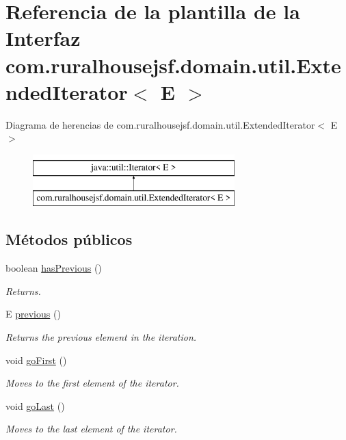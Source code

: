 \hypertarget{interfacecom_1_1ruralhousejsf_1_1domain_1_1util_1_1_extended_iterator}{}\section{Referencia de la plantilla de la Interfaz com.\+ruralhousejsf.\+domain.\+util.\+Extended\+Iterator$<$ E $>$}
\label{interfacecom_1_1ruralhousejsf_1_1domain_1_1util_1_1_extended_iterator}
Diagrama de herencias de com.\+ruralhousejsf.\+domain.\+util.\+Extended\+Iterator$<$ E $>$\begin{figure}[H]
\begin{center}
\leavevmode
\includegraphics[height=2.000000cm]{d5/ded/interfacecom_1_1ruralhousejsf_1_1domain_1_1util_1_1_extended_iterator}
\end{center}
\end{figure}
\subsection*{Métodos públicos}
\begin{DoxyCompactItemize}
\item 
boolean \mbox{\hyperlink{interfacecom_1_1ruralhousejsf_1_1domain_1_1util_1_1_extended_iterator_a8aa41cc3f69db973663cf92a484579a9}{has\+Previous}} ()
\begin{DoxyCompactList}\small\item\em Returns. \end{DoxyCompactList}\item 
E \mbox{\hyperlink{interfacecom_1_1ruralhousejsf_1_1domain_1_1util_1_1_extended_iterator_a4c9f9f5da6e96c08bc44d55517689397}{previous}} ()
\begin{DoxyCompactList}\small\item\em Returns the previous element in the iteration. \end{DoxyCompactList}\item 
void \mbox{\hyperlink{interfacecom_1_1ruralhousejsf_1_1domain_1_1util_1_1_extended_iterator_a1a2554fbed6834a638e31a23b739a684}{go\+First}} ()
\begin{DoxyCompactList}\small\item\em Moves to the first element of the iterator. \end{DoxyCompactList}\item 
void \mbox{\hyperlink{interfacecom_1_1ruralhousejsf_1_1domain_1_1util_1_1_extended_iterator_a055883d2a28df4ac0da7476a2a773f36}{go\+Last}} ()
\begin{DoxyCompactList}\small\item\em Moves to the last element of the iterator. \end{DoxyCompactList}\end{DoxyCompactItemize}


